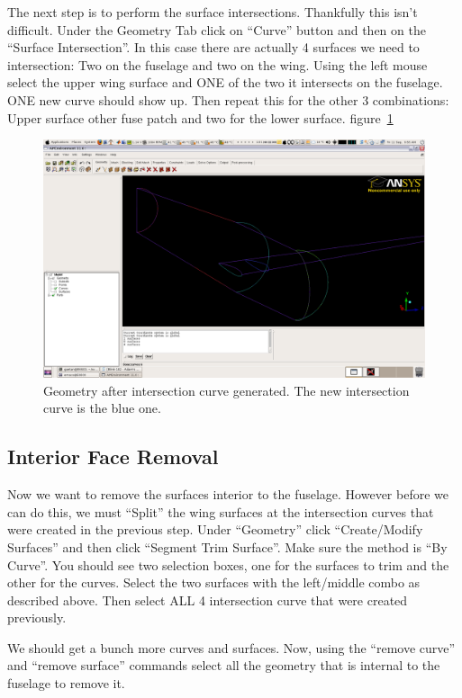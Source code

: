 \documentclass{report}
\begin{document}
The next step is to perform the surface intersections. Thankfully this isn't difficult. Under the Geometry Tab click on ``Curve'' button and then on the ``Surface Intersection''. In this case there are actually 4 surfaces we need to intersection: Two on the fuselage and two on the wing. Using the left mouse select the upper wing surface and ONE of the two it intersects on the fuselage. ONE new curve should show up. Then repeat this for the other 3 combinations: Upper surface other fuse patch and two for the lower surface.  figure~\ref{fig:intersection_curve}
\begin{figure}[htb]
  \centering
  \includegraphics[width=\textwidth,angle=0]{figures/fig3.png}
  \caption{Geometry after intersection curve generated. The new intersection curve is the blue one.}
  \label{fig:intersection_curve}
\end{figure}

\subsection{Interior Face Removal}

Now we want to remove the surfaces interior to the fuselage. However before we can do this, we must ``Split'' the wing surfaces at the intersection curves that were created in the previous step. Under ``Geometry'' click ``Create/Modify Surfaces'' and then click ``Segment Trim Surface''. Make sure the method is ``By Curve''. You should see two selection boxes, one for the surfaces to trim and the other for the curves. Select the two surfaces with the left/middle combo as described above. Then select ALL 4 intersection curve that were created previously.

We should get a bunch more curves and surfaces. Now, using the ``remove curve'' and ``remove surface'' commands select all the geometry that is internal to the fuselage to remove it.
\end{document}
